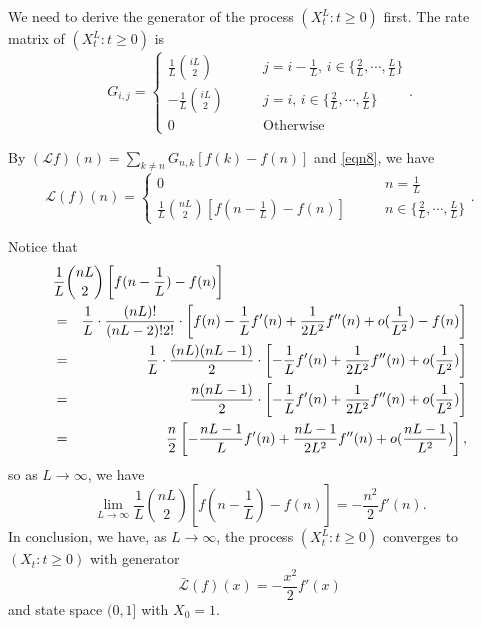 \begin{enumerate}
    We need to derive the generator of the process $(X_t^L: t \ge 0)$ first. The rate matrix of $(X_t^L: t\ge 0 )$ is 
    \begin{equation}\label{eqn8}
        G_{i,j} = \begin{cases}
            \frac{1}{L}\binom{iL}{2} \qquad & j = i - \frac{1}{L}, \, i \in \{\frac{2}{L}, \cdots, \frac{L}{L}\} \\ 
            -\frac{1}{L}\binom{iL}{2} \qquad & j = i, \, i \in \{\frac{2}{L}, \cdots, \frac{L}{L}\} \\ 
            0 \qquad & \text{Otherwise}
        \end{cases}.
    \end{equation}

    By $(\mathcal{L}f)(n) = \sum_{k \neq n} G_{n,k} [f(k) - f(n)]$ and \eqref{eqn8}, we have 
    \begin{equation}\label{eqn9}
        \mathcal{L}(f)(n) = 
        \begin{cases}
            0 \qquad & n = \frac{1}{L} \\ 
            \frac{1}{L}\binom{nL}{2} [f(n-\frac{1}{L}) - f(n)] \qquad & n \in \{\frac{2}{L}, \cdots, \frac{L}{L}\}
        \end{cases}.
    \end{equation}

    Notice that 
    \begin{eqnarray*}
        \lefteqn{\frac{1}{L} \binom{nL}{2} \left[ f(n - \frac{1}{L}) - f(n)\right]} \\ 
        &=& \frac{1}{L} \cdot \frac{(nL)!}{(nL-2)!2!} \cdot \left[ f(n) - \frac{1}{L} f'(n) + \frac{1}{2L^2} f''(n) + o(\frac{1}{L^2}) - f(n) \right] \\ 
        &=& \frac{1}{L} \cdot \frac{(nL)(nL-1)}{2} \cdot \left[ -\frac{1}{L} f'(n) + \frac{1}{2L^2} f''(n) + o(\frac{1}{L^2}) \right] \\ 
        &=& \frac{n(nL-1)}{2} \cdot \left[ -\frac{1}{L} f'(n) + \frac{1}{2L^2} f''(n) + o(\frac{1}{L^2})\right] \\ 
        &=& \frac{n}{2}\left[ -\frac{nL-1}{L}f'(n) + \frac{nL-1}{2L^2}f''(n) + o(\frac{nL-1}{L^2})\right],
    \end{eqnarray*}
    so as $L \to \infty$, we have 
    $$\lim_{L \to \infty} \frac{1}{L} \binom{nL}{2} \left[ f(n - \frac{1}{L}) - f(n) \right] = - \frac{n^2}{2} f'(n).$$
    In conclusion, we have, as $L \to \infty$, the process $(X_t^L: t \ge 0)$ converges to $(X_t: t \ge 0)$ with generator 
    \begin{equation} \label{eqn10}
        \bar{\mathcal{L}}(f)(x) = - \frac{x^2}{2} f'(x)
    \end{equation}
    and state space $(0, 1]$ with $X_0 = 1$.
    

\end{enumerate}
